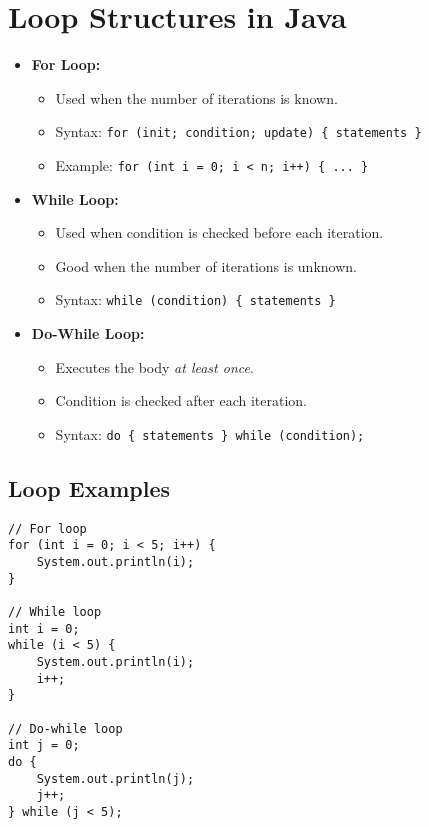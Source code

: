 \documentclass[11pt]{article}
\begin{document}
\section*{Loop Structures in Java}
\begin{itemize}[leftmargin=*]
\item \textbf{For Loop:}
  \begin{itemize}
    \item Used when the number of iterations is known.
    \item Syntax: \texttt{for (init; condition; update) \{ statements \}}
    \item Example: \texttt{for (int i = 0; i < n; i++) \{ ... \}}
  \end{itemize}

\item \textbf{While Loop:}
  \begin{itemize}
    \item Used when condition is checked before each iteration.
    \item Good when the number of iterations is unknown.
    \item Syntax: \texttt{while (condition) \{ statements \}}
  \end{itemize}

\item \textbf{Do-While Loop:}
  \begin{itemize}
    \item Executes the body \textit{at least once}.
    \item Condition is checked after each iteration.
    \item Syntax: \texttt{do \{ statements \} while (condition);}
  \end{itemize}
\end{itemize}

\subsection*{Loop Examples}
\begin{verbatim}
// For loop
for (int i = 0; i < 5; i++) {
    System.out.println(i);
}

// While loop
int i = 0;
while (i < 5) {
    System.out.println(i);
    i++;
}

// Do-while loop
int j = 0;
do {
    System.out.println(j);
    j++;
} while (j < 5);
\end{verbatim}

\newpage
\end{document}
